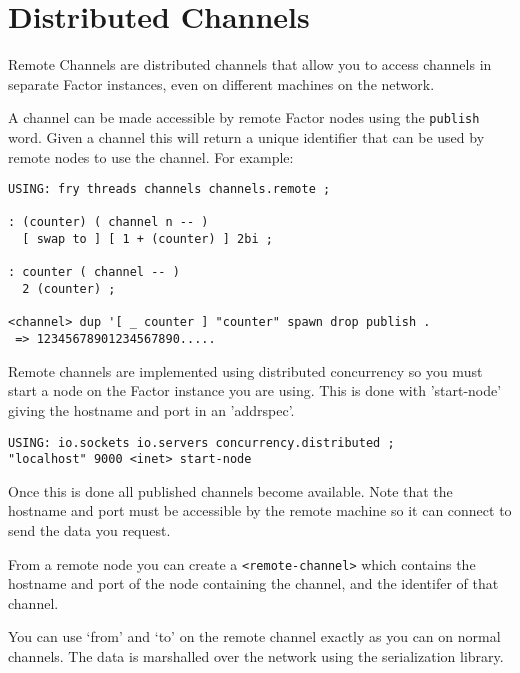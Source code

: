 \chapter{Distributed Channels}\label{dchannels}

Remote Channels are distributed channels that allow you to access
channels in separate Factor instances, even on different machines on
the network. 


A channel can be made accessible by remote Factor nodes using the
\texttt{publish} word. Given a channel this will return a unique
identifier that can be used by remote nodes to use the channel. For
example:

\begin{verbatim}
USING: fry threads channels channels.remote ;

: (counter) ( channel n -- )
  [ swap to ] [ 1 + (counter) ] 2bi ;
    
: counter ( channel -- )
  2 (counter) ;    

<channel> dup '[ _ counter ] "counter" spawn drop publish .
 => 12345678901234567890.....
\end{verbatim}

Remote channels are implemented using
distributed concurrency so you must start a node on the Factor
instance you are using. This is done with 'start-node' giving the
hostname and port in an 'addrspec'.


\begin{verbatim}
USING: io.sockets io.servers concurrency.distributed ;
"localhost" 9000 <inet> start-node
\end{verbatim}

Once this is done all published channels become available. Note that
the hostname and port must be accessible by the remote machine so it
can connect to send the data you request.

From a remote node you can create a \texttt{<remote-channel>} which contains
the hostname and port of the node containing the channel, and the identifer
of that channel.

You can use `from' and `to' on the remote channel exactly as you can
on normal channels. The data is marshalled over the network using the
serialization library.  

